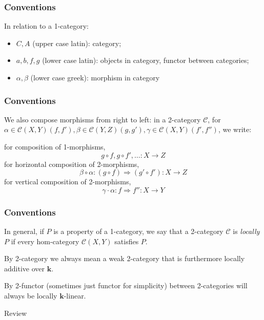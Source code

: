 \documentclass{beamer}
\newcommand{\kk}{{\mathbf{k}}}
\newcommand{\cC}{{\mathcal{C}}}
\begin{document}
\begin{frame}
\frametitle{Conventions}
In relation to a 1-category:
\begin{itemize}
\item $C,A$ (upper case latin): category;

\item $a,b,f,g$ (lower case latin): objects in category,
	functor between categories;

\item $\alpha,\beta$ (lower case greek): morphism in category
\end{itemize}

\end{frame}


\begin{frame}
\frametitle{Conventions}
We also compose morphisms from right to left:
in a 2-category $\cC$,
for $\alpha \in \cC(X,Y)(f,f'),
\beta \in \cC(Y,Z)(g,g'),
\gamma \in \cC(X,Y)(f',f'')$,
we write:

for composition of 1-morphisms,
\[
g \circ f, g \circ f', \ldots : X \to Z
\]
for horizontal composition of 2-morphisms,
\[
\beta \circ \alpha: (g \circ f) \Rightarrow (g' \circ f'):
	X \to Z
\]
for vertical composition of 2-morphisms,
\[
\gamma \cdot \alpha: f \Rightarrow f'' : X \to Y
\]

\end{frame}


\begin{frame}
\frametitle{Conventions}
In general, if $P$ is a property of a 1-category,
we say that a 2-category $\cC$ is \emph{locally $P$}
if every hom-category $\cC(X,Y)$ satisfies $P$.

\pause

By 2-category we always mean a weak 2-category
that is furthermore locally additive over $\kk$.

By 2-functor (sometimes just functor for simplicity)
between 2-categories will always be locally $\kk$-linear.

\end{frame}

\begin{frame}

\begin{center}
\Huge Review
\end{center}
\end{frame}
\end{document}
